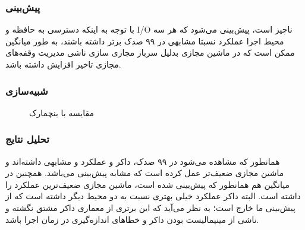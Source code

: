 \subsubsection{پیش‌بینی}
با توجه به اینکه دسترسی به حافظه و I/O ناچیز است، پیش‌بینی می‌شود که
هر سه محیط اجرا عملکرد نسبتا مشابهی در ۹۹ صدک برتر داشته باشند، به طور میانگین ممکن است که
در ماشین مجازی بدلیل سرباز مجازی سازی ناشی مدیریت وقفه‌های مجازی تاخیر افزایش داشته باشد.

\subsubsection{شبیه‌سازی}
\begin{figure}[ht]
    \centering
    \caption{مقایسه با بنچمارک }
\end{figure}

\subsubsection{تحلیل نتایج}
همانطور که مشاهده می‌شود در ۹۹ صدک، داکر و  عملکرد و مشابهی داشته‌اند و ماشین مجازی
ضعیف‌تر عمل کرده است که مشابه پیش‌بینی می‌باشد. همچنین در میانگین هم همانطور که پیش‌بینی شده است، ماشین مجازی ضعیف‌ترین عملکرد را داشته است.
البته داکر عملکرد خیلی بهتری نسبت به دو محیط دیگر داشته است که از پیش‌بینی ما خارج است؛ به نظر می‌آید که این برتری از معماری داکر مشتق نگشته
و ناشی از مینیمالیست بودن داکر و خطاهای اندازه‌گیری در زمان اجرا باشد.


